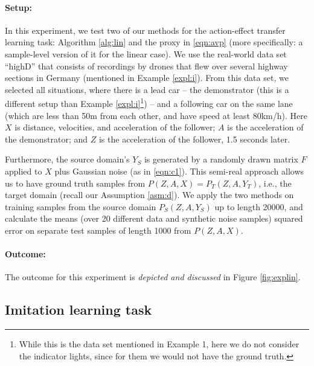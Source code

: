 \documentclass[letterpaper]{article} %
\theoremstyle{definition}%
\theoremstyle{definition}
\newcommand{\dec}{action-effect transfer learning task\xspace}
\begin{document}
\paragraph{Setup:}
In this experiment, we test two of our methods for the \dec: Algorithm \ref{alg:lin} and the proxy in \eqref{eqn:avp} (more specifically: a sample-level version of it for the linear case).
We use the real-world data set ``highD'' \cite{highDdataset} that consists of recordings by drones that flew over several highway sections in Germany (mentioned in Example \ref{expl:i}).
From this data set, we selected all situations, where there is a lead car -- the demonstrator (this is a different setup than Example \ref{expl:i}\footnote{While this is the data set mentioned in Example 1, here we do not consider the indicator lights, since for them we would not have the ground truth.}) -- and a following car on the same lane (which are less than 50m from each other, and have speed at least 80km/h).
Here $X$ is distance, velocities, and acceleration of the follower; $A$ is the acceleration of the demonstrator; and $Z$ is the acceleration of the follower, 1.5 seconds later.

Furthermore, the source domain's $Y_S$ is generated by a randomly drawn matrix $F$ applied to $X$ plus Gaussian noise (as in \eqref{eqn:c1}).
This semi-real approach allows us to have ground truth samples from $P(Z, A, X) = P_T(Z, A, Y_T)$, i.e., the target domain (recall our Assumption \ref{asm:d}).
We apply the two methods on training samples from the source domain $P_S(Z, A, Y_S)$ up to length 20000, and calculate the means (over 20 different data and synthetic noise samples) squared error on separate test samples of length 1000 from $P(Z, A, X)$.

\paragraph{Outcome:}
The outcome for this experiment is \emph{depicted and discussed} in Figure \ref{fig:explin}.



\subsection{Imitation learning task}\label{sec:exp_imi}

\end{document}
